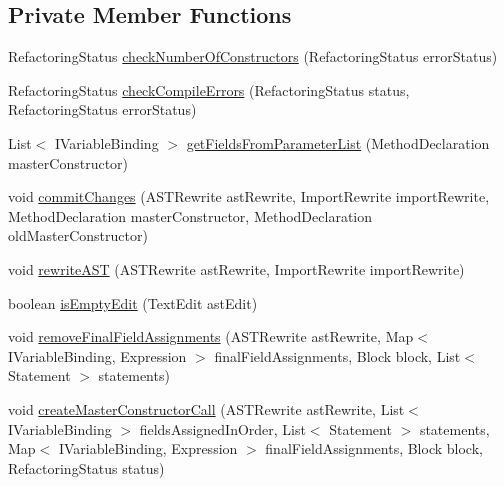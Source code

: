 \subsection*{Private Member Functions}
\begin{DoxyCompactItemize}
\item 
RefactoringStatus \hyperlink{classedu_1_1illinois_1_1canistelCassabanana_1_1RemoveDuplicateCodeInConstructorsRefactoring_a4462be965c484c7b5cde7305c6e8e08b}{checkNumberOfConstructors} (RefactoringStatus errorStatus)
\item 
RefactoringStatus \hyperlink{classedu_1_1illinois_1_1canistelCassabanana_1_1RemoveDuplicateCodeInConstructorsRefactoring_a63c9b559e564a9d3d3699316fd9e774a}{checkCompileErrors} (RefactoringStatus status, RefactoringStatus errorStatus)
\item 
List$<$ IVariableBinding $>$ \hyperlink{classedu_1_1illinois_1_1canistelCassabanana_1_1RemoveDuplicateCodeInConstructorsRefactoring_abb745254790297cb0209e888bd7f5a40}{getFieldsFromParameterList} (MethodDeclaration masterConstructor)
\item 
void \hyperlink{classedu_1_1illinois_1_1canistelCassabanana_1_1RemoveDuplicateCodeInConstructorsRefactoring_a7d9dbde135be1cdf95bdb29b3d1f52ec}{commitChanges} (ASTRewrite astRewrite, ImportRewrite importRewrite, MethodDeclaration masterConstructor, MethodDeclaration oldMasterConstructor)
\item 
void \hyperlink{classedu_1_1illinois_1_1canistelCassabanana_1_1RemoveDuplicateCodeInConstructorsRefactoring_a602006eb1454fdcbbe6e84f29ca01130}{rewriteAST} (ASTRewrite astRewrite, ImportRewrite importRewrite)
\item 
boolean \hyperlink{classedu_1_1illinois_1_1canistelCassabanana_1_1RemoveDuplicateCodeInConstructorsRefactoring_a2f13ae3bf9c9cd61095bf4b857f07b3d}{isEmptyEdit} (TextEdit astEdit)
\item 
void \hyperlink{classedu_1_1illinois_1_1canistelCassabanana_1_1RemoveDuplicateCodeInConstructorsRefactoring_a3fc8aaa7e5ed3f45299931fe12e5f456}{removeFinalFieldAssignments} (ASTRewrite astRewrite, Map$<$ IVariableBinding, Expression $>$ finalFieldAssignments, Block block, List$<$ Statement $>$ statements)
\item 
void \hyperlink{classedu_1_1illinois_1_1canistelCassabanana_1_1RemoveDuplicateCodeInConstructorsRefactoring_aa8f45c2c71d398d0245412b526365d98}{createMasterConstructorCall} (ASTRewrite astRewrite, List$<$ IVariableBinding $>$ fieldsAssignedInOrder, List$<$ Statement $>$ statements, Map$<$ IVariableBinding, Expression $>$ finalFieldAssignments, Block block, RefactoringStatus status)

\end{DoxyCompactItemize}

